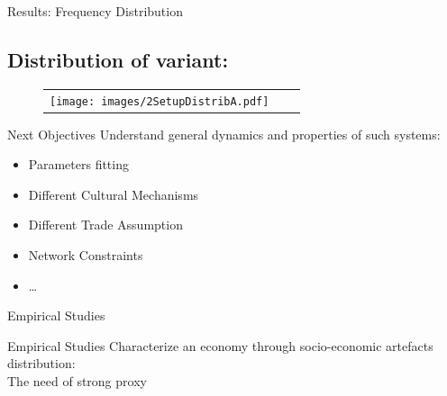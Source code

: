 \documentclass[12pt, notes=show,handout=no]{beamer}
\begin{document}
\begin{frame}{Results: Frequency Distribution}
    \subsection*{Distribution of variant:}
    \begin{figure}[!h]
	\begin{center}
	    \begin{tabular}{ccc}
		\texttt{[image: images/2SetupDistribA.pdf]}\\
	    \end{tabular}

	\end{center}
    \end{figure}
\end{frame}

\begin{frame}{Next Objectives}
    \vfill
    Understand general dynamics and properties of such systems:
    \vfill
	\begin{itemize}
	\item Parameters fitting
    \vfill
	\item Different Cultural Mechanisms
    \vfill
	\item Different Trade Assumption
    \vfill
	\item Network Constraints
    \vfill
	\item \dots
    \vfill
	\end{itemize}
\end{frame}

\begin{frame}
    \centering
    \Large
   Empirical Studies 
\end{frame}
\begin{frame}{Empirical Studies}
	Characterize an economy through socio-economic artefacts distribution:\\
	\hspace{1cm} The need of strong proxy
\end{frame}
\end{document}
